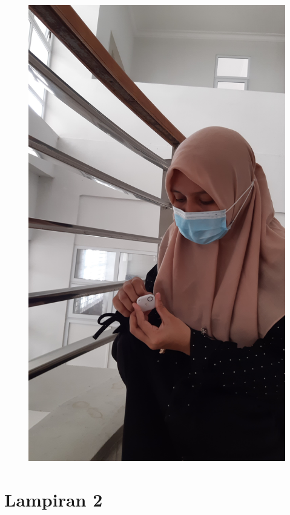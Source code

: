 \begin{figure}[H]
  \center
  \includegraphics [width = 13.5 cm, height= 6.75 cm]{gambar/lampiran/lamp1b.JPG}
\end{figure}
\label{sus-dosen}



\vspace{2cm}




\chapter*{Lampiran 2}

